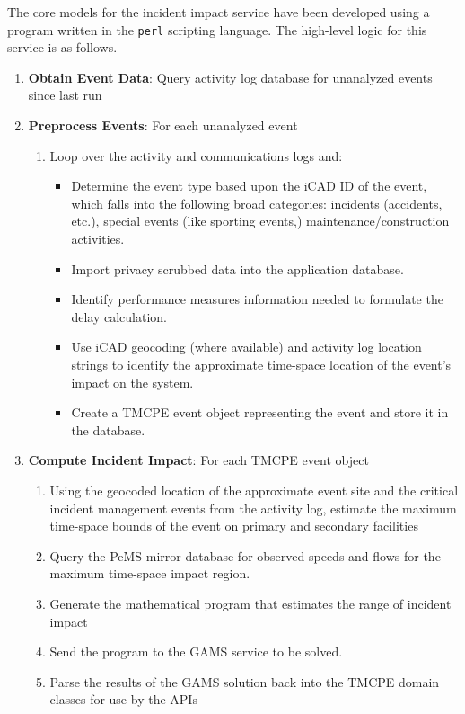 \documentclass[12pt]{report}
\renewcommand{\fixme}[3][]{#1\xspace}
\newcounter{time}
\newcounter{space}
\begin{document}
The core models for the incident impact service have been developed using a
program written in the \texttt{perl} scripting language.  The high-level logic
for this service is as follows.
\begin{enumerate}
\item {\sc \textbf{Obtain Event Data}}: Query activity log database
  for unanalyzed events since last run
\item {\sc\textbf{Preprocess Events}}: For each unanalyzed event
  \begin{enumerate}
  \item Loop over the activity and communications logs and:
    \begin{itemize}
    \item Determine the event type based upon the \ac{iCAD} ID of the event,
      which falls into the following broad categories: incidents (accidents,
      etc.), special events (like sporting events,) 
      maintenance/construction activities.
    \item Import privacy scrubbed data into the application database.
    \item Identify performance measures information needed to
      formulate the delay calculation.
    \item Use \ac{iCAD} geocoding (where available) and activity log
      location strings to identify the approximate time-space location
      of the event's impact on the system.
    \item Create a \ac{TMCPE} event object representing the event and
      store it in the database.
    \end{itemize}
  \end{enumerate}
\item {\sc\textbf{Compute Incident Impact}}: For each \ac{TMCPE} event object
  \begin{enumerate}
  \item Using the geocoded location of the approximate event site and
    the critical incident management events from the activity log,
    \fixme[estimate the maximum time-space bounds]{crindt}{more
      detail} of the event on primary and secondary facilities
  \item Query the \ac{PeMS} mirror database for observed speeds and flows
    for the maximum time-space impact region.
  \item Generate the mathematical program that estimates the range
    of incident impact
  \item Send the program to the \fixme[\ac{GAMS} service]{crindt}{explain} to
    be solved.
  \item Parse the results of the GAMS solution back into the \ac{TMCPE}
    domain classes for use by the \acp{API}
  \end{enumerate}
\end{enumerate}
\end{document}
